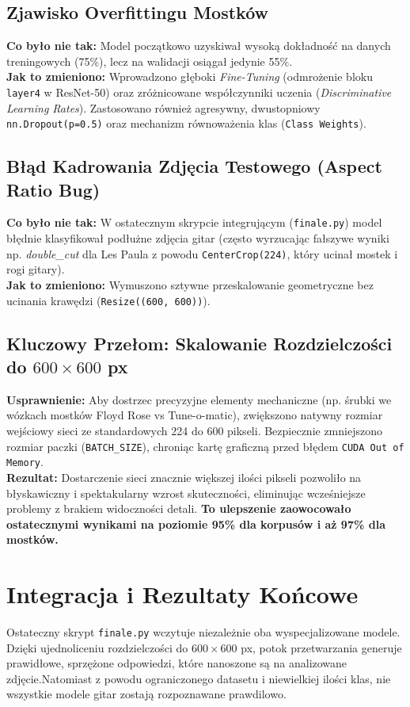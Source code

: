 \documentclass[12pt,a4paper]{article}
\begin{document}
\subsection{Zjawisko Overfittingu Mostków}
\textbf{Co było nie tak:} Model początkowo uzyskiwał wysoką dokładność na danych treningowych (75\%), lecz na walidacji osiągał jedynie 55\%.\\
\textbf{Jak to zmieniono:} Wprowadzono głęboki \textit{Fine-Tuning} (odmrożenie bloku \texttt{layer4} w ResNet-50) oraz zróżnicowane współczynniki uczenia (\textit{Discriminative Learning Rates}). Zastosowano również agresywny, dwustopniowy \texttt{nn.Dropout(p=0.5)} oraz mechanizm równoważenia klas (\texttt{Class Weights}).

\subsection{Błąd Kadrowania Zdjęcia Testowego (Aspect Ratio Bug)}
\textbf{Co było nie tak:} W ostatecznym skrypcie integrującym (\texttt{finale.py}) model błędnie klasyfikował podłużne zdjęcia gitar (często wyrzucając fałszywe wyniki np. \textit{double\_cut} dla Les Paula z powodu \texttt{CenterCrop(224)}, który ucinał mostek i rogi gitary).\\
\textbf{Jak to zmieniono:} Wymuszono sztywne przeskalowanie geometryczne bez ucinania krawędzi (\texttt{Resize((600, 600))}).

\subsection{Kluczowy Przełom: Skalowanie Rozdzielczości do $600\times600$ px}
\textbf{Usprawnienie:} Aby dostrzec precyzyjne elementy mechaniczne (np. śrubki we wózkach mostków Floyd Rose vs Tune-o-matic), zwiększono natywny rozmiar wejściowy sieci ze standardowych 224 do 600 pikseli. Bezpiecznie zmniejszono rozmiar paczki (\texttt{BATCH\_SIZE}), chroniąc kartę graficzną przed błędem \texttt{CUDA Out of Memory}.\\
\textbf{Rezultat:} Dostarczenie sieci znacznie większej ilości pikseli pozwoliło na błyskawiczny i spektakularny wzrost skuteczności, eliminując wcześniejsze problemy z brakiem widoczności detali. \textbf{To ulepszenie zaowocowało ostatecznymi wynikami na poziomie 95\% dla korpusów i aż 97\% dla mostków.}

\section{Integracja i Rezultaty Końcowe}
Ostateczny skrypt \texttt{finale.py} wczytuje niezależnie oba wyspecjalizowane modele. Dzięki ujednoliceniu rozdzielczości do $600\times600$ px, potok przetwarzania generuje prawidłowe, sprzężone odpowiedzi, które nanoszone są na analizowane zdjęcie.Natomiast z powodu ograniczonego datasetu i niewielkiej ilości klas, nie wszystkie modele gitar zostają rozpoznawane prawdilowo.
\end{document}
